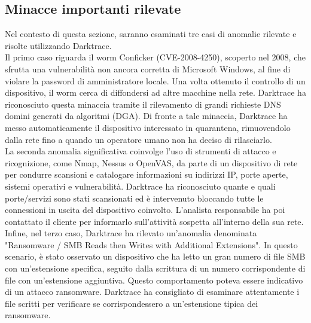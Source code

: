 \subsection{Minacce importanti rilevate}
Nel contesto di questa sezione, saranno esaminati tre casi di anomalie rilevate e risolte utilizzando Darktrace.\\
Il primo caso riguarda il worm Conficker (CVE-2008-4250), scoperto nel 2008, che sfrutta una vulnerabilità non ancora corretta di Microsoft Windows, al fine di violare la password di amministratore locale. Una volta ottenuto il controllo di un dispositivo, il worm cerca di diffondersi ad altre macchine nella rete. Darktrace ha riconosciuto questa minaccia tramite il rilevamento di grandi richieste DNS domini generati da algoritmi (DGA). Di fronte a tale minaccia, Darktrace ha messo automaticamente il dispositivo interessato in quarantena, rimuovendolo dalla rete fino a quando un operatore umano non ha deciso di rilasciarlo.\\
La seconda anomalia significativa coinvolge l'uso di strumenti di attacco e ricognizione, come Nmap, Nessus o OpenVAS, da parte di un dispositivo di rete per condurre scansioni e catalogare informazioni su indirizzi IP, porte aperte, sistemi operativi e vulnerabilità. Darktrace ha riconosciuto quante e quali porte/servizi sono stati scansionati ed è intervenuto bloccando tutte le connessioni in uscita del dispositivo coinvolto. L'analista responsabile ha poi contattato il cliente per informarlo sull'attività sospetta all'interno della sua rete.\\
Infine, nel terzo caso, Darktrace ha rilevato un'anomalia denominata "Ransomware / SMB Reads then Writes with Additional Extensions". In questo scenario, è stato osservato un dispositivo che ha letto un gran numero di file SMB con un'estensione specifica, seguito dalla scrittura di un numero corrispondente di file con un'estensione aggiuntiva. Questo comportamento poteva essere indicativo di un attacco ransomware. Darktrace ha consigliato di esaminare attentamente i file scritti per verificare se corrispondessero a un'estensione tipica dei ransomware.


